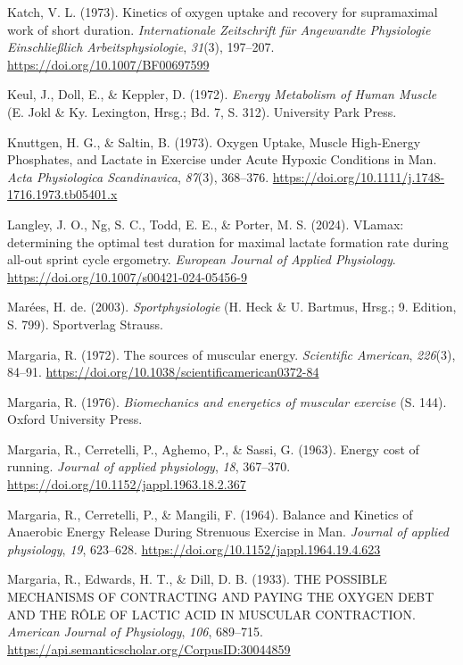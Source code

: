 \documentclass[
  letterpaper,
  DIV=11]{scrartcl}
\newlength{\cslhangindent}
\newenvironment{CSLReferences}[2] %
 {\begin{list}{}{%
  \setlength{\itemindent}{0pt}
  \setlength{\leftmargin}{0pt}
  \setlength{\parsep}{0pt}
  \ifodd #1
   \setlength{\leftmargin}{\cslhangindent}
   \setlength{\itemindent}{-1\cslhangindent}
  \fi
  \setlength{\itemsep}{#2\baselineskip}}}
 {\end{list}}
\begin{document}
\begin{CSLReferences}{1}{0}
Katch, V. L. (1973). {Kinetics of oxygen uptake and recovery for
supramaximal work of short duration}. \emph{Internationale Zeitschrift
f{ü}r Angewandte Physiologie Einschlie{ß}lich Arbeitsphysiologie},
\emph{31}(3), 197--207. \url{https://doi.org/10.1007/BF00697599}

Keul, J., Doll, E., \& Keppler, D. (1972). \emph{{Energy Metabolism of
Human Muscle}} (E. Jokl \& Ky. Lexington, Hrsg.; Bd. 7, S. 312).
University Park Press.

Knuttgen, H. G., \& Saltin, B. (1973). {Oxygen Uptake, Muscle
High‐Energy Phosphates, and Lactate in Exercise under Acute Hypoxic
Conditions in Man}. \emph{Acta Physiologica Scandinavica}, \emph{87}(3),
368--376. \url{https://doi.org/10.1111/j.1748-1716.1973.tb05401.x}

Langley, J. O., Ng, S. C., Todd, E. E., \& Porter, M. S. (2024).
{VLamax: determining the optimal test duration for maximal lactate
formation rate during all-out sprint cycle ergometry}. \emph{European
Journal of Applied Physiology}.
\url{https://doi.org/10.1007/s00421-024-05456-9}

Marées, H. de. (2003). \emph{{Sportphysiologie}} (H. Heck \& U. Bartmus,
Hrsg.; 9. Edition, S. 799). Sportverlag Strauss.

Margaria, R. (1972). {The sources of muscular energy.} \emph{Scientific
American}, \emph{226}(3), 84--91.
\url{https://doi.org/10.1038/scientificamerican0372-84}

Margaria, R. (1976). \emph{{Biomechanics and energetics of muscular
exercise}} (S. 144). Oxford University Press.

Margaria, R., Cerretelli, P., Aghemo, P., \& Sassi, G. (1963). {Energy
cost of running.} \emph{Journal of applied physiology}, \emph{18},
367--370. \url{https://doi.org/10.1152/jappl.1963.18.2.367}

Margaria, R., Cerretelli, P., \& Mangili, F. (1964). {Balance and
Kinetics of Anaerobic Energy Release During Strenuous Exercise in Man}.
\emph{Journal of applied physiology}, \emph{19}, 623--628.
\url{https://doi.org/10.1152/jappl.1964.19.4.623}

Margaria, R., Edwards, H. T., \& Dill, D. B. (1933). {THE POSSIBLE
MECHANISMS OF CONTRACTING AND PAYING THE OXYGEN DEBT AND THE R{Ô}LE OF
LACTIC ACID IN MUSCULAR CONTRACTION}. \emph{American Journal of
Physiology}, \emph{106}, 689--715.
\url{https://api.semanticscholar.org/CorpusID:30044859}


\end{CSLReferences}
\end{document}
